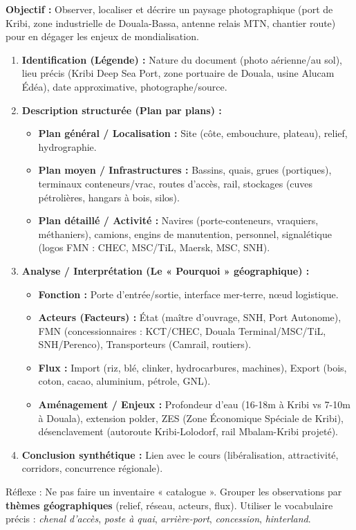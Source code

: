 \documentclass[11pt]{article}
\newcommand{\cle}[1]{{\popxbold\color{popdark}#1}}
\begin{document}
\begin{methode}
\textbf{Objectif :} Observer, localiser et décrire un paysage photographique (port de Kribi, zone industrielle de Douala-Bassa, antenne relais MTN, chantier route) pour en dégager les enjeux de mondialisation.
\begin{enumerate}
    \item \textbf{Identification (Légende) :} Nature du document (photo aérienne/au sol), lieu précis (Kribi Deep Sea Port, zone portuaire de Douala, usine Alucam Édéa), date approximative, photographe/source.
    \item \textbf{Description structurée (Plan par plans) :}
    \begin{itemize}
        \item \textbf{Plan général / Localisation :} Site (côte, embouchure, plateau), relief, hydrographie.
        \item \textbf{Plan moyen / Infrastructures :} Bassins, quais, grues (portiques), terminaux conteneurs/vrac, routes d'accès, rail, stockages (cuves pétrolières, hangars à bois, silos).
        \item \textbf{Plan détaillé / Activité :} Navires (porte-conteneurs, vraquiers, méthaniers), camions, engins de manutention, personnel, signalétique (logos FMN : CHEC, MSC/TiL, Maersk, MSC, SNH).
    \end{itemize}
    \item \textbf{Analyse / Interprétation (Le « Pourquoi » géographique) :}
    \begin{itemize}
        \item \textbf{Fonction :} Porte d'entrée/sortie, interface mer-terre, nœud logistique.
        \item \textbf{Acteurs (Facteurs) :} État (maître d'ouvrage, SNH, Port Autonome), FMN (concessionnaires : KCT/CHEC, Douala Terminal/MSC/TiL, SNH/Perenco), Transporteurs (Camrail, routiers).
        \item \textbf{Flux :} Import (riz, blé, clinker, hydrocarbures, machines), Export (bois, coton, cacao, aluminium, pétrole, GNL).
        \item \textbf{Aménagement / Enjeux :} Profondeur d'eau (16-18m à Kribi vs 7-10m à Douala), extension polder, ZES (Zone Économique Spéciale de Kribi), désenclavement (autoroute Kribi-Lolodorf, rail Mbalam-Kribi projeté).
    \end{itemize}
    \item \textbf{Conclusion synthétique :} Lien avec le cours (libéralisation, attractivité, corridors, concurrence régionale).
\end{enumerate}
\cle{Réflexe} : Ne pas faire un inventaire « catalogue ». Grouper les observations par \textbf{thèmes géographiques} (relief, réseau, acteurs, flux). Utiliser le vocabulaire précis : \emph{chenal d'accès}, \emph{poste à quai}, \emph{arrière-port}, \emph{concession}, \emph{hinterland}.
\end{methode}
\end{document}
